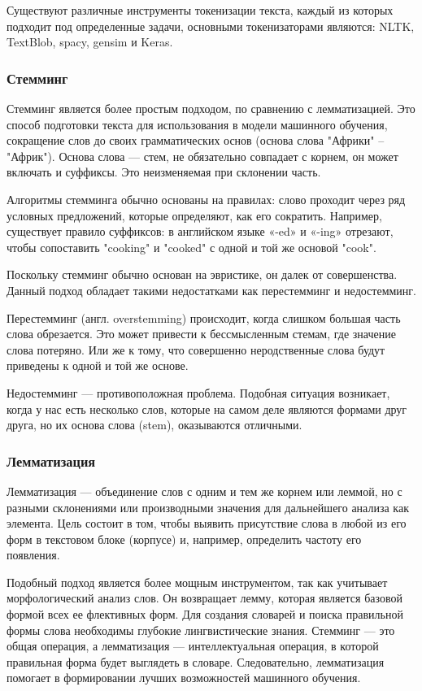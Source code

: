 Существуют различные инструменты токенизации текста, каждый из которых подходит под определенные задачи, основными токенизаторами являются: NLTK, TextBlob, spacy, gensim и Keras.

\subsubsection{Стемминг}

Стемминг является более простым подходом, по сравнению с лемматизацией. Это способ подготовки текста для использования в модели машинного обучения, сокращение слов до своих грамматических основ (основа слова "Африки" – "Африк"). Основа слова --- стем, не обязательно совпадает с корнем, он может включать и суффиксы. Это неизменяемая при склонении часть.

Алгоритмы стемминга обычно основаны на правилах: слово проходит через ряд условных предложений, которые определяют, как его сократить. Например, существует правило суффиксов: в английском языке «-ed» и «-ing» отрезают, чтобы сопоставить "cooking" и "cooked" с одной и той же основой "cook".

Поскольку стемминг обычно основан на эвристике, он далек от совершенства. Данный подход обладает такими недостатками как перестемминг и недостемминг.

Перестемминг (англ. overstemming) происходит, когда слишком большая часть слова обрезается. Это может привести к бессмысленным стемам, где значение слова потеряно. Или же к тому, что совершенно неродственные слова будут приведены к одной и той же основе.

Недостемминг — противоположная проблема. Подобная ситуация возникает, когда у нас есть несколько слов, которые на самом деле являются формами друг друга, но их основа слова (stem), оказываются отличными.

\subsubsection{Лемматизация}

Лемматизация --- объединение слов с одним и тем же корнем или леммой, но с разными склонениями или производными значения для дальнейшего анализа как элемента. Цель состоит в том, чтобы выявить присутствие слова в любой из его форм в текстовом блоке (корпусе) и, например, определить частоту его появления.

Подобный подход является более мощным инструментом, так как учитывает морфологический анализ слов. Он возвращает лемму, которая является базовой формой всех ее флективных форм. Для создания словарей и поиска правильной формы слова необходимы глубокие лингвистические знания. Стемминг --- это общая операция, а лемматизация --- интеллектуальная операция, в которой правильная форма будет выглядеть в словаре. Следовательно, лемматизация помогает в формировании лучших возможностей машинного обучения.

